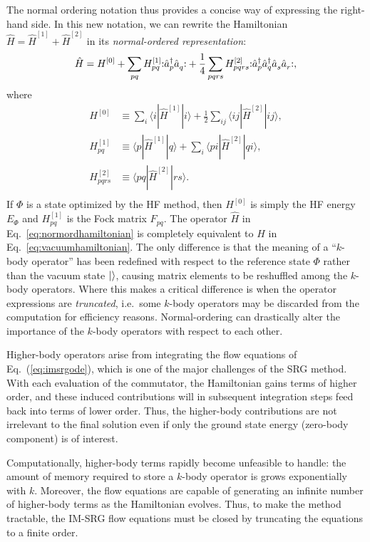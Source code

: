 The normal ordering notation thus provides a concise way of expressing the right-hand side.  In this new notation, we can rewrite the Hamiltonian $\hat H = \hat{H}^{[1]} + \hat{H}^{[2]}$ in its \emph{normal-ordered representation}:
\begin{align}
  \hat{H} = H^{[0]} + \sum_{p q} H^{[1]}_{p q} \mathopen: \hat{a}_p^\dagger \hat{a}_q^{} \mathclose: + \frac{1}{4} \sum_{p q r s} H^{[2]}_{p q r s} \mathopen: \hat{a}_p^\dagger \hat{a}_q^\dagger \hat{a}_s^{} \hat{a}_r^{} \mathclose:,
  \label{eq:normordhamiltonian}
\end{align}
where
\begin{align*}
  H^{[0]} &\equiv \sum_i \langle i | \hat{H}^{[1]} | i \rangle + \frac{1}{2} \sum_{i j} \langle i j | \hat{H}^{[2]} | i j \rangle, \\
  H^{[1]}_{p q} &\equiv \langle p | \hat{H}^{[1]} | q \rangle + \sum_i \langle p i | \hat{H}^{[2]} | q i \rangle, \\
  H^{[2]}_{p q r s} &\equiv \langle p q | \hat{H}^{[2]} | r s \rangle. \\
\end{align*}
If $\Phi$ is a state optimized by the HF method, then $H^{[0]}$ is simply the HF energy $E_\Phi$ and $H^{[1]}_{p q}$ is the Fock matrix $F_{p q}$.  The operator $\hat H$ in Eq.\ \eqref{eq:normordhamiltonian} is completely equivalent to $\hat H$ in Eq.\ \eqref{eq:vacuumhamiltonian}.  The only difference is that the meaning of a ``$k$-body operator'' has been redefined with respect to the reference state $\Phi$ rather than the vacuum state $|  \rangle$, causing matrix elements to be reshuffled among the $k$-body operators.  Where this makes a critical difference is when the operator expressions are \emph{truncated}, i.e.\ some $k$-body operators may be discarded from the computation for efficiency reasons.  Normal-ordering can drastically alter the importance of the $k$-body operators with respect to each other.

Higher-body operators arise from integrating the flow equations of Eq.~(\ref{eq:imsrgode}), which is one of the major challenges of the SRG method.  With each evaluation of the commutator, the Hamiltonian gains terms of higher order, and these induced contributions will in subsequent integration steps feed back into terms of lower order.  Thus, the higher-body contributions are not irrelevant to the final solution even if only the ground state energy (zero-body component) is of interest.

Computationally, higher-body terms rapidly become unfeasible to handle: the amount of memory required to store a $k$-body operator is grows exponentially with $k$.  Moreover, the flow equations are capable of generating an infinite number of higher-body terms as the Hamiltonian evolves.  Thus, to make the method tractable, the IM-SRG flow equations must be closed by truncating the equations to a finite order.

